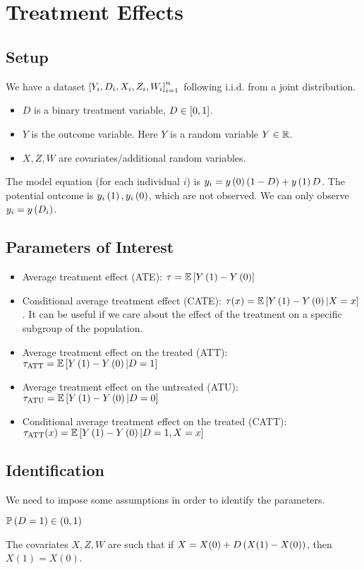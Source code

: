 \section{Treatment Effects}
\subsection{Setup} We have a dataset $\left[Y_i,D_i,X_i,Z_i,W_i\right]_{i=1}^n$ following i.i.d. from a joint distribution.
\begin{itemize}
    \item $D$ is a binary treatment variable, $D\in\left[0,1\right]$. 
    \item $Y$ is the outcome variable. Here $Y$ is a random variable $Y\in \mathbb{R}$. 
    \item $X,Z,W$ are covariates/additional random variables.
\end{itemize}
The model equation (for each individual $i$) is $y_i=y\left(0\right)(1-D)+y\left(1\right)D$. The potential outcome is $y_i\left(1\right),y_i\left(0\right)$, which are not observed. We can only observe $y_i=y\left(D_i\right)$.

\subsection{Parameters of Interest}
\begin{itemize}
    \item Average treatment effect (ATE): $\tau = \mathbb{E}\left[Y\left(1\right)-Y\left(0\right)\right]$
    \item Conditional average treatment effect (CATE): $\tau(x) = \mathbb{E}\left[Y\left(1\right)-Y\left(0\right)|X=x\right]$. It can be useful if we care about the effect of the treatment on a specific subgroup of the population.
    \item Average treatment effect on the treated (ATT): $\tau_{\text{ATT}} = \mathbb{E}\left[Y\left(1\right)-Y\left(0\right)|D=1\right]$
    \item Average treatment effect on the untreated (ATU): $\tau_{\text{ATU}} = \mathbb{E}\left[Y\left(1\right)-Y\left(0\right)|D=0\right]$
    \item Conditional average treatment effect on the treated (CATT): $\tau_{\text{ATT}}(x) = \mathbb{E}\left[Y\left(1\right)-Y\left(0\right)|D=1,X=x\right]$
\end{itemize}

\subsection{Identification}
We need to impose some assumptions in order to identify the parameters.
\begin{assumption}
    $\mathbb{P}\left(D=1\right)\in \left(0,1\right)$
\end{assumption}
\begin{assumption}
    The covariates $X,Z,W$ are such that if $X=X(0)+D\left(X(1)-X(0)\right)$, then $X(1)=X(0)$.
\end{assumption}

